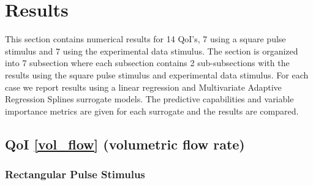\documentclass[12pt]{article}
\numberwithin{equation}{section}
\begin{document}
\section{Results}
This section contains numerical results for 14 QoI's, 7 using a square pulse stimulus and 7 using the experimental data stimulus. The section is organized into 7 subsection where each subsection contains 2 sub-subsections with the results using the square pulse stimulus and experimental data stimulus. For each case we report results using a linear regression and Multivariate Adaptive Regression Splines surrogate models. The predictive capabilities and variable importance metrics are given for each surrogate and the results are compared.

\newpage

\subsection{QoI \eqref{vol_flow} (volumetric flow rate)}

\subsubsection{Rectangular Pulse Stimulus}
\end{document}
